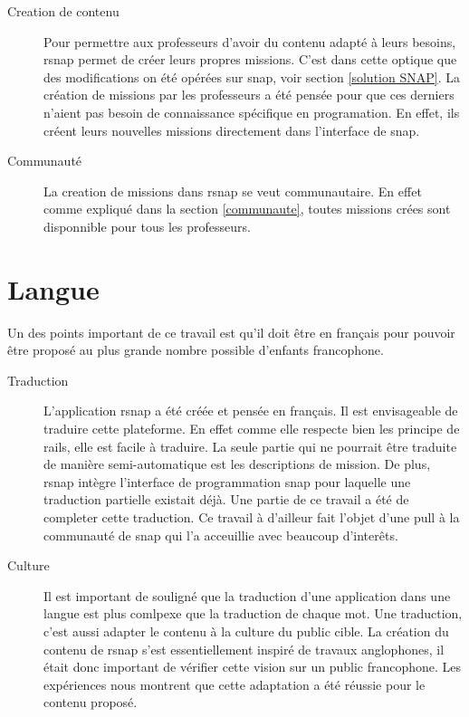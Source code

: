 \begin{description}
  \item[Creation de contenu] Pour permettre aux professeurs d'avoir du contenu adapté à leurs besoins, \gls{rsnap} permet de créer leurs propres \glspl{mission}. C'est dans cette optique que des modifications on été opérées sur \gls{snap}, voir section \ref{solution SNAP}. La création de \glspl{mission} par les professeurs a été pensée pour que ces derniers n'aient pas besoin de connaissance spécifique en programation. En effet, ils créent leurs nouvelles \glspl{mission} directement dans l'interface de \gls{snap}.

  \item[Communauté] La creation de \glspl{mission} dans \gls{rsnap} se veut communautaire. En effet comme expliqué dans la section \ref{communaute}, toutes \glspl{mission} crées sont disponnible pour tous les professeurs.
\end{description}

\section{Langue}

Un des points important de ce travail est qu'il doit être en français pour pouvoir être proposé au plus grande nombre possible d'enfants francophone.

\begin{description}
  \item[Traduction] L'application \gls{rsnap} a été créée et pensée en français. Il est envisageable de traduire cette plateforme. En effet comme elle respecte bien les principe de \gls{rails}, elle est facile à traduire. La seule partie qui ne pourrait être traduite de manière semi-automatique est les descriptions de \gls{mission}. De plus, \gls{rsnap} intègre l'interface de programmation \gls{snap} pour laquelle une traduction partielle existait déjà. Une partie de ce travail a été de completer cette traduction. Ce travail à d'ailleur fait l'objet d'une \gls{pull} à la communauté de \gls{snap} qui l'a acceuillie avec beaucoup d'interêts.

  \item[Culture] Il est important de souligné que la traduction d'une application dans une langue est plus comlpexe que la traduction de chaque mot. Une traduction, c'est aussi adapter le contenu à la culture du public cible. La création du contenu de \gls{rsnap} s'est essentiellement inspiré de travaux anglophones, il était donc important de vérifier cette vision sur un public francophone. Les expériences nous montrent que cette adaptation a été réussie pour le contenu proposé.

\end{description}

